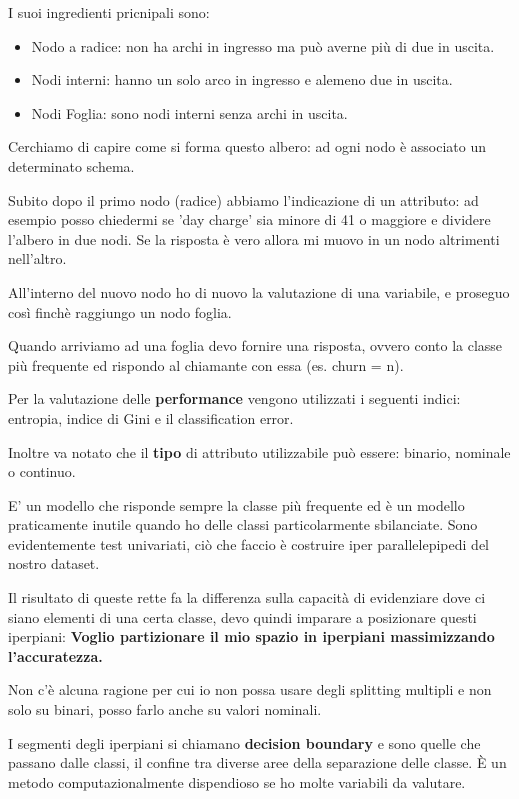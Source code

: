 \documentclass[12pt, a4paper,titlepage,openany]{article}
\begin{document}
I suoi ingredienti pricnipali sono:
\begin{itemize}
	\item Nodo a radice: non ha archi in ingresso ma può averne più di due in uscita.
	\item Nodi interni: hanno un solo arco in ingresso e alemeno due in uscita.
	\item Nodi Foglia: sono nodi interni senza archi in uscita.
\end{itemize}
Cerchiamo di capire come si forma questo albero: ad ogni nodo è associato un determinato schema.

Subito dopo il primo nodo (radice) abbiamo l'indicazione di un attributo: ad esempio posso chiedermi se 'day charge' sia minore di 41 o maggiore e dividere l'albero in due nodi. Se la risposta è vero allora mi muovo in un nodo altrimenti nell'altro.

All'interno del nuovo nodo ho di nuovo la valutazione di una variabile, e proseguo cos\`i finch\`e raggiungo un nodo foglia.

Quando arriviamo ad una foglia devo fornire una risposta, ovvero conto la classe più frequente ed rispondo al chiamante con essa (es. churn = n).

Per la valutazione delle \textbf{performance} vengono utilizzati i seguenti indici: entropia, indice di Gini e il classification error. 

Inoltre va notato che il \textbf{tipo} di attributo utilizzabile pu\`o essere: binario, nominale o continuo.

E' un modello che risponde sempre la classe più frequente ed è un modello praticamente inutile quando ho delle classi particolarmente sbilanciate. Sono evidentemente test univariati, ciò che faccio è costruire iper parallelepipedi del nostro dataset.

Il risultato di queste rette fa la differenza sulla capacità di evidenziare dove ci siano elementi di una certa classe, devo quindi imparare a posizionare questi iperpiani: \textbf{Voglio partizionare il mio spazio in iperpiani massimizzando l'accuratezza.}

Non c'è alcuna ragione per cui io non possa usare degli splitting multipli e non solo su binari, posso farlo anche su valori nominali.

I segmenti degli iperpiani si chiamano \textbf{decision boundary} e sono quelle che passano dalle classi, il confine tra diverse aree della separazione delle classe. \`E un metodo computazionalmente dispendioso se ho molte variabili da valutare.
\end{document}
